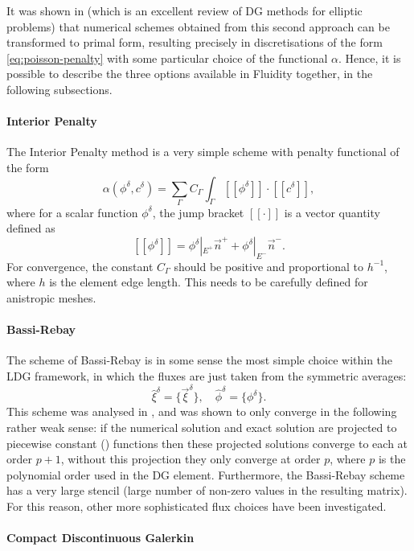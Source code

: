It was shown in \citet{arnold2002} (which is an excellent review of DG
methods for elliptic problems) that numerical schemes obtained from
this second approach can be transformed to primal form, resulting
precisely in discretisations of the form \eqref{eq:poisson-penalty}
with some particular choice of the functional $\alpha$. Hence, it is
possible to describe the three options available in Fluidity together,
in the following subsections.

\paragraph{Interior Penalty}
The Interior Penalty method is a very simple scheme with penalty
functional of the form
\begin{equation}
\label{eq:ip}
\alpha(\phi^\delta,c^\delta) = \sum_{\Gamma}C_{\Gamma}\int_{\Gamma}
[[\phi^\delta]]\cdot[[c^\delta]],
\end{equation}
where for a scalar function $\phi^\delta$, the jump bracket
$[[\cdot]]$ is a vector quantity defined as
\[
[[\phi^\delta]] = \phi^\delta|_{E^+}\vec{n}^+ + \phi^\delta|_{E^-}\vec{n}^-.
\]
For convergence, the constant $C_{\Gamma}$ should be positive and
proportional to $h^{-1}$, where $h$ is the element edge length. This
needs to be carefully defined for anistropic meshes.

\paragraph{Bassi-Rebay}
\label{BassiRebay}
The scheme of Bassi-Rebay \citep{bassi1997} is in some sense the most
simple choice within the LDG framework, in which the fluxes are just
taken from the symmetric averages:
\[
\hat{\xi}^\delta = \{\vec{\xi}^\delta\}, \quad
\hat{\phi}^\delta = \{\phi^\delta\}.
\]
This scheme was analysed in \cite{arnold2002}, and was shown to only
converge in the following rather weak sense: if the numerical solution
and exact solution are projected to piecewise constant
(\Pzero) functions then these projected solutions converge to each at order $p+1$,
without this projection they only converge at order $p$, where $p$ is
the polynomial order used in the DG element. Furthermore, the
Bassi-Rebay scheme has a very large stencil (large number of non-zero
values in the resulting matrix). For this reason, other more
sophisticated flux choices have been investigated.

\paragraph{Compact Discontinuous Galerkin}
\label{CDG}

